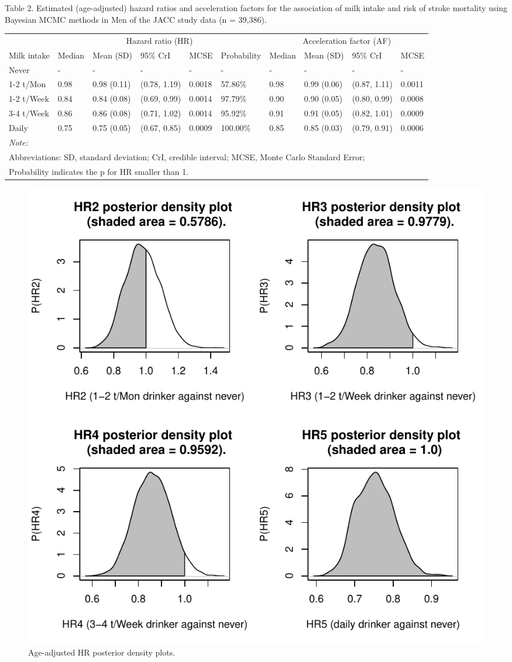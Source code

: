 \documentclass[]{tufte-handout}
\begin{document}
\begin{table}[!htbp]
Table 2. Estimated (age-adjusted) hazard ratios and acceleration factors for the association of milk intake and risk of stroke mortality using Bayesian MCMC methods in Men of the JACC study data (n = 39,386).

\centering
\fontsize{8}{10}\selectfont
\begin{tabular}[t]{llllllllll}
\toprule
\multicolumn{1}{c}{ } & \multicolumn{5}{c}{Hazard ratio (HR)} & \multicolumn{4}{c}{Acceleration factor (AF)} \\
\cmidrule(l{3pt}r{3pt}){2-6} \cmidrule(l{3pt}r{3pt}){7-10}
Milk intake & Median & Mean (SD) & 95\% CrI & MCSE & Probability & Median & Mean (SD) & 95\% CrI & MCSE\\
\midrule
\rowcolor{gray!6}  Never & - & - & - & - & - & - & - & - & -\\
1-2 t/Mon & 0.98 & 0.98 (0.11) & (0.78, 1.19) & 0.0018 & 57.86\% & 0.98 & 0.99 (0.06) & (0.87, 1.11) & 0.0011\\
\rowcolor{gray!6}  1-2 t/Week & 0.84 & 0.84 (0.08) & (0.69, 0.99) & 0.0014 & 97.79\% & 0.90 & 0.90 (0.05) & (0.80, 0.99) & 0.0008\\
3-4 t/Week & 0.86 & 0.86 (0.08) & (0.71, 1.02) & 0.0014 & 95.92\% & 0.91 & 0.91 (0.05) & (0.82, 1.01) & 0.0009\\
\rowcolor{gray!6}  Daily & 0.75 & 0.75 (0.05) & (0.67, 0.85) & 0.0009 & 100.00\% & 0.85 & 0.85 (0.03) & (0.79, 0.91) & 0.0006\\
\bottomrule
\multicolumn{10}{l}{\textit{Note: }}\\
\multicolumn{10}{l}{Abbreviations: SD, standard deviation; CrI, credible interval; MCSE, Monte Carlo Standard Error;}\\
\multicolumn{10}{l}{ Probability indicates the p for HR smaller than 1.}\\
\end{tabular}
\end{table}

\begin{figure}
\includegraphics{HandOutEngBayes_files/figure-latex/unnamed-chunk-10-1} \caption[Age-adjusted HR posterior density plots]{Age-adjusted HR posterior density plots.}\label{fig:unnamed-chunk-10}
\end{figure}


\end{document}

